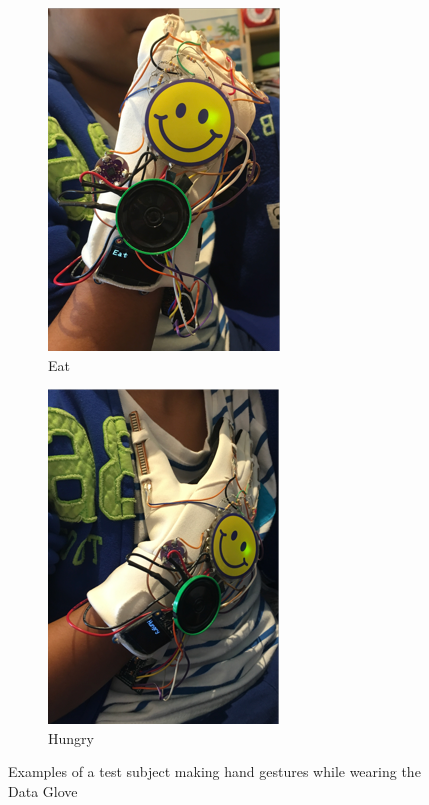 \begin{figure}
    \centering
    \begin{subfigure}{.4\linewidth}
        \centering
        \setlength\figureheight{\linewidth}
        \setlength\figurewidth{\linewidth}
        \includegraphics{./assets/img/Eat}
        \caption{Eat}
        \label{fig:eat}
    \end{subfigure}
    \begin{subfigure}{.4\linewidth}
        \centering
        \setlength\figureheight{\linewidth}
        \setlength\figurewidth{\linewidth}
        \includegraphics{./assets/img/Hungry}
        \caption{Hungry}
        \label{fig:hungry}
    \end{subfigure}
    \caption{Examples of a test subject making hand gestures while wearing the Data Glove}
    \label{fig:examplegestures2}
\end{figure}

